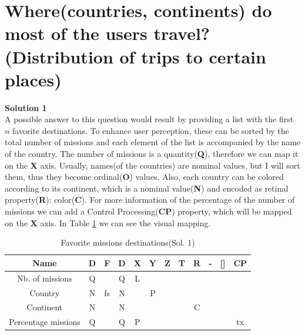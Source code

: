 \documentclass{article}
\begin{document}
\newpage
\section{Where(countries, continents) do most of the users travel? (Distribution of trips to certain places)}
\large{\textbf{Solution 1}}\\
A possible answer to this question would result by providing a list with the first $n$ favorite destinations. To enhance user perception, these can be sorted by the total number of missions and each element of the list is accompanied by the name of the country. The number of missions is a quantity(\textbf{Q}), therefore we can map it on the \textbf{X} axis. Usually, names(of the countries) are nominal values, but I will sort them, thus they become ordinal(\textbf{O}) values. Also, each country can be colored according to its continent, which is a nominal value(\textbf{N}) and encoded as retinal property(\textbf{R}): color(\textbf{C}). For more information of the percentage of the number of missions we can add a Control Processing(\textbf{CP}) property, which will be mapped on the \textbf{X} axis. In Table \ref{table3} we can see the visual mapping.

\begin{table}[h!]
	\begin{center}
		\begin{tabular}{|c | c | c | c || c | c | c | c | c| c| c || c|} 
			\hline
			Name & D & F & D\textquotesingle  & X & Y & Z & T & R & -& [] & CP \\ [0.5ex] 
			\hline\hline
			Nb. of missions & Q &  & Q &  L &   &   &   &   &   &   &   \\ [0.5ex] 
			\hline
			Country  & N & fs & N &  & P  &   &   &   &   &   &   \\ [0.5ex] 
			\hline
			Continent  & N &  & N &  &   &   &   & C  &   &   &   \\ [0.5ex] 
			\hline
			Percentage missions  & Q &  & Q & P &   &   &   &   &   &   & tx  \\ [0.5ex] 
			\hline
			
		\end{tabular}
		\caption{Favorite missions destinations(Sol. 1)}
		\label{table3}
	\end{center}
\end{table}
\end{document}
